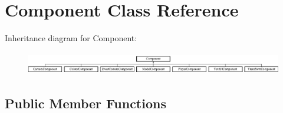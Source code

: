 \hypertarget{class_component}{\section{Component Class Reference}
\label{class_component}
}
Inheritance diagram for Component\+:\begin{figure}[H]
\begin{center}
\leavevmode
\includegraphics[height=1.006289cm]{class_component}
\end{center}
\end{figure}
\subsection*{Public Member Functions}
